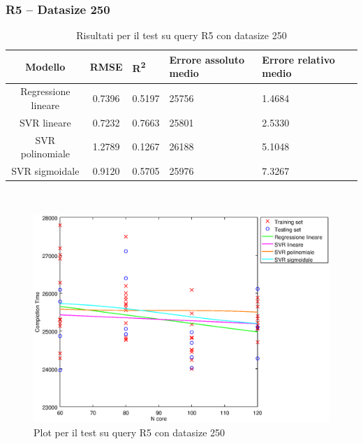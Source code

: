 \documentclass[a4paper,11pt]{article}
\begin{document}
\subsubsection{R5 -- Datasize 250}
\begin{table}[bhpt]
	\centering
	\begin{adjustbox}{center}
		\begin{tabular}{c | c M{1.2cm} M{2.5cm} M{2.5cm} M{1.8cm}}
			Modello & RMSE & R\textsuperscript{2} & Errore assoluto medio & Errore relativo medio \tabularnewline
			\hline
			Regressione lineare & 0.7396 & 0.5197 &  25756 & 1.4684 \\
			SVR lineare & 0.7232 & 0.7663 &  25801 & 2.5330 \\
			SVR polinomiale & 1.2789 & 0.1267 &  26188 & 5.1048 \\
			SVR sigmoidale & 0.9120 & 0.5705 &  25976 & 7.3267 \\
		\end{tabular}
	\end{adjustbox}
	\\
	\caption{Risultati per il test su query R5 con datasize 250}
	\label{table_R5_250}
\end{table}

\begin {figure}[hbtp]
\centering
\includegraphics[width=\textwidth]{output/R5_250/plot_R5_250.eps}
\caption {Plot per il test su query R5 con datasize 250}
\end {figure}
\newpage
\end{document}
